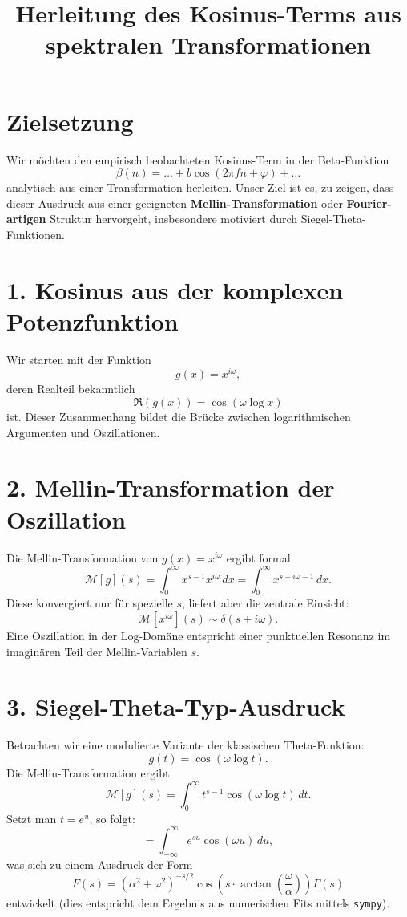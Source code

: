 \documentclass[a4paper,12pt]{article}
\title{Herleitung des Kosinus-Terms aus spektralen Transformationen}
\author{}
\date{}
\begin{document}
\maketitle

\section*{Zielsetzung}

Wir möchten den empirisch beobachteten Kosinus-Term in der Beta-Funktion
\[
\beta(n) = \dots + b \cos(2\pi f n + \varphi) + \dots
\]
analytisch aus einer Transformation herleiten. Unser Ziel ist es, zu zeigen, dass dieser Ausdruck aus einer geeigneten \textbf{Mellin-Transformation} oder \textbf{Fourier-artigen} Struktur hervorgeht, insbesondere motiviert durch Siegel-Theta-Funktionen.

\section*{1. Kosinus aus der komplexen Potenzfunktion}

Wir starten mit der Funktion
\[
g(x) = x^{i\omega},
\]
deren Realteil bekanntlich
\[
\Re(g(x)) = \cos(\omega \log x)
\]
ist. Dieser Zusammenhang bildet die Brücke zwischen logarithmischen Argumenten und Oszillationen.

\section*{2. Mellin-Transformation der Oszillation}

Die Mellin-Transformation von $g(x) = x^{i\omega}$ ergibt formal
\[
\mathcal{M}[g](s) = \int_0^\infty x^{s-1} x^{i\omega} \, dx = \int_0^\infty x^{s + i\omega - 1} \, dx.
\]
Diese konvergiert nur für spezielle $s$, liefert aber die zentrale Einsicht:
\[
\mathcal{M}[x^{i\omega}](s) \sim \delta(s + i\omega).
\]
Eine Oszillation in der Log-Domäne entspricht einer punktuellen Resonanz im imaginären Teil der Mellin-Variablen $s$.

\section*{3. Siegel-Theta-Typ-Ausdruck}

Betrachten wir eine modulierte Variante der klassischen Theta-Funktion:
\[
g(t) = \cos(\omega \log t).
\]
Die Mellin-Transformation ergibt
\[
\mathcal{M}[g](s) = \int_0^\infty t^{s-1} \cos(\omega \log t) \, dt.
\]
Setzt man $t = e^u$, so folgt:
\[
= \int_{-\infty}^\infty e^{su} \cos(\omega u) \, du,
\]
was sich zu einem Ausdruck der Form
\[
F(s) = \left( \alpha^2 + \omega^2 \right)^{-s/2} \cos\left(s \cdot \arctan\left(\frac{\omega}{\alpha}\right)\right) \Gamma(s)
\]
entwickelt (dies entspricht dem Ergebnis aus numerischen Fits mittels \texttt{sympy}).
\end{document}
